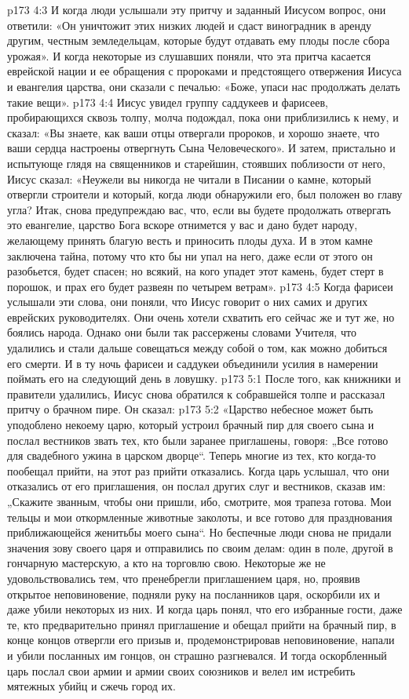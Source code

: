 \vs p173 4:3 \pc И когда люди услышали эту притчу и заданный Иисусом вопрос, они ответили: «Он уничтожит этих низких людей и сдаст виноградник в аренду другим, честным земледельцам, которые будут отдавать ему плоды после сбора урожая». И когда некоторые из слушавших поняли, что эта притча касается еврейской нации и ее обращения с пророками и предстоящего отвержения Иисуса и евангелия царства, они сказали с печалью: «Боже, упаси нас продолжать делать такие вещи».
\vs p173 4:4 Иисус увидел группу саддукеев и фарисеев, пробирающихся сквозь толпу, молча подождал, пока они приблизились к нему, и сказал: «Вы знаете, как ваши отцы отвергали пророков, и хорошо знаете, что ваши сердца настроены отвергнуть Сына Человеческого». И затем, пристально и испытующе глядя на священников и старейшин, стоявших поблизости от него, Иисус сказал: «Неужели вы никогда не читали в Писании о камне, который отвергли строители и который, когда люди обнаружили его, был положен во главу угла? Итак, снова предупреждаю вас, что, если вы будете продолжать отвергать это евангелие, царство Бога вскоре отнимется у вас и дано будет народу, желающему принять благую весть и приносить плоды духа. И в этом камне заключена тайна, потому что кто бы ни упал на него, даже если от этого он разобьется, будет спасен; но всякий, на кого упадет этот камень, будет стерт в порошок, и прах его будет развеян по четырем ветрам».
\vs p173 4:5 Когда фарисеи услышали эти слова, они поняли, что Иисус говорит о них самих и других еврейских руководителях. Они очень хотели схватить его сейчас же и тут же, но боялись народа. Однако они были так рассержены словами Учителя, что удалились и стали дальше совещаться между собой о том, как можно добиться его смерти. И в ту ночь фарисеи и саддукеи объединили усилия в намерении поймать его на следующий день в ловушку.
\vs p173 5:1 После того, как книжники и правители удалились, Иисус снова обратился к собравшейся толпе и рассказал притчу о брачном пире. Он сказал:
\vs p173 5:2 \pc «Царство небесное может быть уподоблено некоему царю, который устроил брачный пир для своего сына и послал вестников звать тех, кто были заранее приглашены, говоря: „Все готово для свадебного ужина в царском дворце“. Теперь многие из тех, кто когда\hyp{}то пообещал прийти, на этот раз прийти отказались. Когда царь услышал, что они отказались от его приглашения, он послал других слуг и вестников, сказав им: „Скажите званным, чтобы они пришли, ибо, смотрите, моя трапеза готова. Мои тельцы и мои откормленные животные заколоты, и все готово для празднования приближающейся женитьбы моего сына“. Но беспечные люди снова не придали значения зову своего царя и отправились по своим делам: один в поле, другой в гончарную мастерскую, а кто на торговлю свою. Некоторые же не удовольствовались тем, что пренебрегли приглашением царя, но, проявив открытое неповиновение, подняли руку на посланников царя, оскорбили их и даже убили некоторых из них. И когда царь понял, что его избранные гости, даже те, кто предварительно принял приглашение и обещал прийти на брачный пир, в конце концов отвергли его призыв и, продемонстрировав неповиновение, напали и убили посланных им гонцов, он страшно разгневался. И тогда оскорбленный царь послал свои армии и армии своих союзников и велел им истребить мятежных убийц и сжечь город их.
